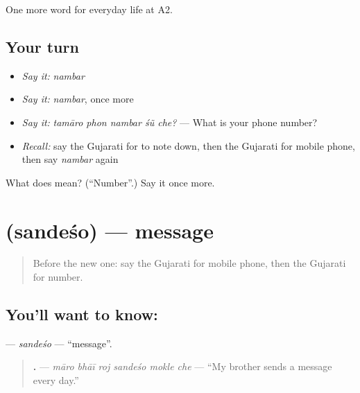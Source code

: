 \begin{grammarlens}[title={What you've built}]
One more word for everyday life at A2.
\end{grammarlens}

\subsection*{Your turn}
\begin{itemize}
\raggedright
  \item \emph{Say it:} \emph{nambar}
  \item \emph{Say it:} \emph{nambar}, once more
  \item \emph{Say it:} \emph{tamāro phon nambar śũ che?} — What is your phone number?
  \item \emph{Recall:} say the Gujarati for to note down, then the Gujarati for mobile phone, then say \emph{nambar} again
\end{itemize}

\begin{tcolorbox}[breakable,colback=teal!4,colframe=teal!35!black,title={Before you move on}]
What does  mean? (\textquotedblleft{}Number\textquotedblright{}.) Say it once more.
\end{tcolorbox}
\section[\texorpdfstring{\gu{સંદેશો} (sandeśo)}{સંદેશો (sandeśo)}]{ (sandeśo) — message}

\label{lesson:GU-C249-sandesho}



\begin{quote}
Before the new one: say the Gujarati for mobile phone, then the Gujarati for number.
\end{quote}

\subsection*{You'll want to know: }
\textbf{} — \emph{sandeśo} — \textquotedblleft{}message\textquotedblright{}.

\begin{quote}
\textbf{     .} — \emph{māro bhāī roj sandeśo mokle che} — \textquotedblleft{}My brother sends a message every day.\textquotedblright{}
\end{quote}

